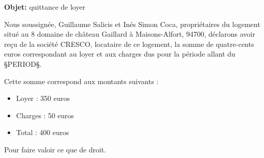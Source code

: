 \documentclass[11pt]{letter}
\date{§DATE§}
\begin{document}
\begin{letter}{}
\opening{\textbf{Objet:} quittance de loyer}

\vspace{5mm}
\hspace{5mm} Nous soussignée, Guillaume Salicis et Inés Simon Coca, propriétaires du logement situé au 8 domaine de château Gaillard à Maisons-Alfort, 94700, déclarons avoir reçu de la société CRESCO, locataire de ce logement, la somme de quatre-cents euros correspondant au loyer et aux charges dus pour la période allant du §PERIOD§.

\vspace{5mm}
Cette somme correspond aux montants suivants :
\begin{itemize}   
\item Loyer : 350 euros
\item Charges : 50 euros
\item Total : 400 euros
\end{itemize}

\closing{Pour faire valoir ce que de droit.}
\end{letter}
\end{document}
